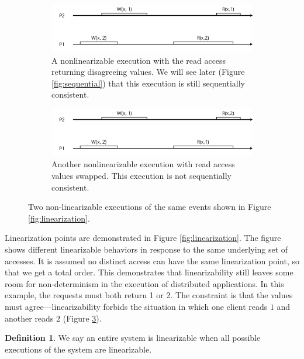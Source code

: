 \documentclass[]             %
{NASA}                       %
\theoremstyle{definition}
\newtheorem{definition}{Definition}[section]
\begin{document}
\begin{figure}[p]
     \begin{subfigure}[a]{1\textwidth}
         \center
         \includegraphics[scale=0.4]{images/nonlinear1.png}
         \caption{A nonlinearizable execution with the read access returning disagreeing values. We will see later (Figure \ref{fig:sequential}) that this execution is still sequentially consistent. }
         \label{fig:nonlinear1}
     \end{subfigure}
     \begin{subfigure}[b]{1\textwidth}
         \center
         \includegraphics[scale=0.4]{images/nonlinear2.png}
         \caption{Another nonlinearizable execution with read access values swapped. This execution is not sequentially consistent.}
         \label{fig:nonlinear2}
     \end{subfigure}
  \caption{Two non-linearizable executions of the same events shown in Figure \ref{fig:linearization}.}
  \label{fig:nonlinearizable}
\end{figure}

Linearization points are demonstrated in Figure \ref{fig:linearization}.
The figure shows different linearizable behaviors in response to the
same underlying set of accesses. It is assumed no distinct access can
have the same linearization point, so that we get a total order. This
demonstrates that linearizability still leaves some room for
non-determinism in the execution of distributed applications. In this
example, the requests must both return 1 or 2. The constraint is that
the values must agree---linearizability forbids the situation in which
one client reads \(1\) and another reads \(2\) (Figure
\ref{fig:nonlinearizable}).

\begin{definition}
We say an entire system is linearizable when all
possible executions of the system are linearizable.
\end{definition}
\end{document}
